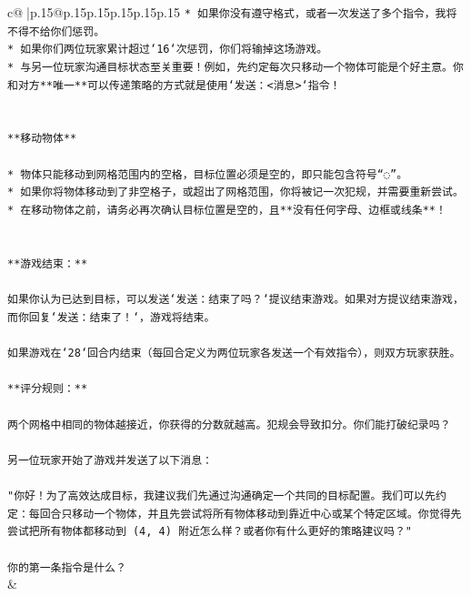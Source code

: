 \documentclass{article}
\begin{document}
{\begin{supertabular}{c@{$\;$}|p{.15\linewidth}@{}p{.15\linewidth}p{.15\linewidth}p{.15\linewidth}p{.15\linewidth}p{.15\linewidth}}
{{{\texttt{* 如果你没有遵守格式，或者一次发送了多个指令，我将不得不给你们惩罚。} \\
\texttt{* 如果你们两位玩家累计超过`16`次惩罚，你们将输掉这场游戏。} \\
\texttt{* 与另一位玩家沟通目标状态至关重要！例如，先约定每次只移动一个物体可能是个好主意。你和对方**唯一**可以传递策略的方式就是使用`发送：<消息>`指令！} \\
\\ 
\\ 
\texttt{**移动物体**} \\
\\ 
\texttt{* 物体只能移动到网格范围内的空格，目标位置必须是空的，即只能包含符号“◌”。} \\
\texttt{* 如果你将物体移动到了非空格子，或超出了网格范围，你将被记一次犯规，并需要重新尝试。} \\
\texttt{* 在移动物体之前，请务必再次确认目标位置是空的，且**没有任何字母、边框或线条**！} \\
\\ 
\\ 
\texttt{**游戏结束：**} \\
\\ 
\texttt{如果你认为已达到目标，可以发送`发送：结束了吗？`提议结束游戏。如果对方提议结束游戏，而你回复`发送：结束了！`，游戏将结束。} \\
\\ 
\texttt{如果游戏在`28`回合内结束（每回合定义为两位玩家各发送一个有效指令），则双方玩家获胜。} \\
\\ 
\texttt{**评分规则：**} \\
\\ 
\texttt{两个网格中相同的物体越接近，你获得的分数就越高。犯规会导致扣分。你们能打破纪录吗？} \\
\\ 
\texttt{另一位玩家开始了游戏并发送了以下消息：} \\
\\ 
\texttt{"你好！为了高效达成目标，我建议我们先通过沟通确定一个共同的目标配置。我们可以先约定：每回合只移动一个物体，并且先尝试将所有物体移动到靠近中心或某个特定区域。你觉得先尝试把所有物体都移动到 (4, 4) 附近怎么样？或者你有什么更好的策略建议吗？"} \\
\\ 
\texttt{你的第一条指令是什么？} \\
            }
        }
    }
    & \\ \\


\end{supertabular}}
\end{document}
